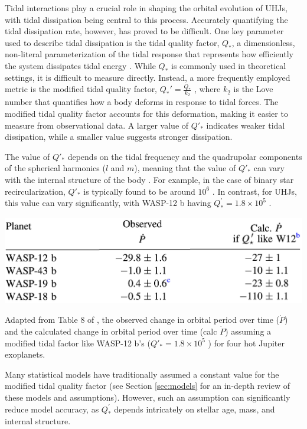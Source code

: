 \documentclass[oneside,12pt]{amsart}
\numberwithin{page}{section}
\begin{document}
Tidal interactions play a crucial role in shaping the orbital evolution of UHJs, with tidal dissipation being central to this process. Accurately quantifying the tidal dissipation rate, however, has proved to be difficult. One key parameter used to describe tidal dissipation is the tidal quality factor, $Q_*$, a dimensionless, non-literal parameterization of the tidal response that represents how efficiently the system dissipates tidal energy \citep{ogilvie2014tidal}. While $Q_*$ is commonly used in theoretical settings, it is difficult to measure directly. Instead, a more frequently employed metric is the modified tidal quality factor, $Q_*' = \frac{Q_*}{k_2}$ \citep{patel2022constraining}, where $k_2$ is the Love number that quantifies how a body deforms in response to tidal forces. The modified tidal quality factor accounts for this deformation, making it easier to measure from observational data. A larger value of $Q'_*$ indicates weaker tidal dissipation, while a smaller value suggests stronger dissipation.

The value of $Q'_*$ depends on the tidal frequency and the quadrupolar components of the spherical harmonics ($l$ and $m$), meaning that the value of $Q'_*$ can vary with the internal structure of the body \citep{ogilvie2014tidal}. For example, in the case of binary star recircularization, $Q'_*$ is typically found to be around $10^6$ \citep{ogilvie2007tidal}. In contrast, for UHJs, this value can vary significantly, with WASP-12 b having $Q^{'}_{*} = 1.8 \times 10^5$ \citep{yee2019orbit}.

\begin{table}[htbp]
    \centering
    \includegraphics[width=0.85\linewidth]{figs/adams_tbl8.png}
    \caption{Adapted from Table 8 of \citet{adams2024doomed}, the observed change in orbital period over time ($\dot{P}$) and the calculated change in orbital period over time (calc $\dot{P}$) assuming a modified tidal factor like WASP-12 b's ($Q'_* = 1.8 \times 10^5$ \citep{yee2019orbit}) for four hot Jupiter exoplanets.}
    \label{tab:adams-tbl8}
\end{table}

Many statistical models have traditionally assumed a constant value for the modified tidal quality factor (see Section \ref{sec:models} for an in-depth review of these models and assumptions). However, such an assumption can significantly reduce model accuracy, as $Q^{'}_{*}$ depends intricately on stellar age, mass, and internal structure.
\end{document}
